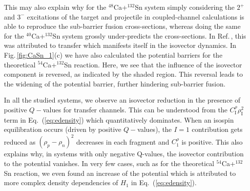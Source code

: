 This may also explain why for the $^{48}$Ca+$^{132}$Sn system simply considering the $2^+$ and
$3^-$ excitations of the target and projectile in coupled-channel calculations is able to
reproduce the sub-barrier fusion cross-sections, whereas doing the same for the $^{40}$Ca+$^{132}$Sn system grossly under-predicts the cross-sections.
In Ref.\,\citep{kolata2012}, this was attributed to transfer
which manifests itself in the isovector dynamics.
In Fig.\,\ref{fig:CaSn_1}(c) we have also calculated the potential barriers for the theoretical
$^{54}$Ca+$^{132}$Sn reaction. Here, we see that the influence of the isovector component
is reversed, as indicated by the shaded region. This reversal leads to the widening of
the potential barrier, further hindering sub-barrier fusion.

In all the studied systems, we observe an isovector reduction in the presence of  positive $Q-$values for transfer channels.
This can be understood from the $C_\mathrm{I}^{\rho}            \rho_\mathrm{I}^2$ term in Eq.~(\ref{eq:edensity})
which quantitatively dominates.
When an isospin equilibration occurs (driven by positive $Q-$values),
the $I=1$ contribution gets reduced as $(\rho_p-\rho_n)^2$ decreases
in each fragment and $C_1^\rho$ is positive.
This also explains why, in systems with only negative Q-values, the isovector contribution to the potential
vanishes.
In very few cases, such as for the theoretical $^{54}$Ca+$^{132}$Sn reaction,
we even found an increase of the
potential which is attributed to more complex density dependencies of $H_1$ in Eq.~(\ref{eq:edensity}).

